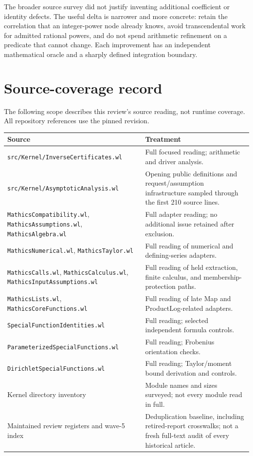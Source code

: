 \documentclass[11pt,a4paper]{article}
\newcommand{\code}[1]{\nolinkurl{#1}}
\begin{document}
The broader source survey did not justify inventing additional coefficient or identity defects. The useful delta is narrower and more concrete: retain the correlation that an integer-power node already knows, avoid transcendental work for admitted rational powers, and do not spend arithmetic refinement on a predicate that cannot change. Each improvement has an independent mathematical oracle and a sharply defined integration boundary.

\appendix
\section{Source-coverage record}\label{app:coverage}

The following scope describes this review's source reading, not runtime coverage. All repository references use the pinned revision.

\begin{longtable}{@{}>{\raggedright\arraybackslash}p{}>{\raggedright\arraybackslash}p{}@{}}
\toprule
Source & Treatment\\
\midrule
\endhead
\code{src/Kernel/InverseCertificates.wl} & Full focused reading; arithmetic and driver analysis.\\
\code{src/Kernel/AsymptoticAnalysis.wl} & Opening public definitions and request/assumption infrastructure sampled through the first 210 source lines.\\
\code{MathicsCompatibility.wl}, \code{MathicsAssumptions.wl}, \code{MathicsAlgebra.wl} & Full adapter reading; no additional issue retained after exclusion.\\
\code{MathicsNumerical.wl}, \code{MathicsTaylor.wl} & Full reading of numerical and defining-series adapters.\\
\code{MathicsCalls.wl}, \code{MathicsCalculus.wl}, \code{MathicsInputAssumptions.wl} & Full reading of held extraction, finite calculus, and membership-protection paths.\\
\code{MathicsLists.wl}, \code{MathicsCoreFunctions.wl} & Full reading of late Map and ProductLog-related adapters.\\
\code{SpecialFunctionIdentities.wl} & Full reading; selected independent formula controls.\\
\code{ParameterizedSpecialFunctions.wl} & Full reading; Frobenius orientation checks.\\
\code{DirichletSpecialFunctions.wl} & Full reading; Taylor/moment bound derivation and controls.\\
Kernel directory inventory & Module names and sizes surveyed; not every module read in full.\\
Maintained review registers and wave-5 index & Deduplication baseline, including retired-report crosswalks; not a fresh full-text audit of every historical article.\\
\bottomrule
\end{longtable}
\end{document}
